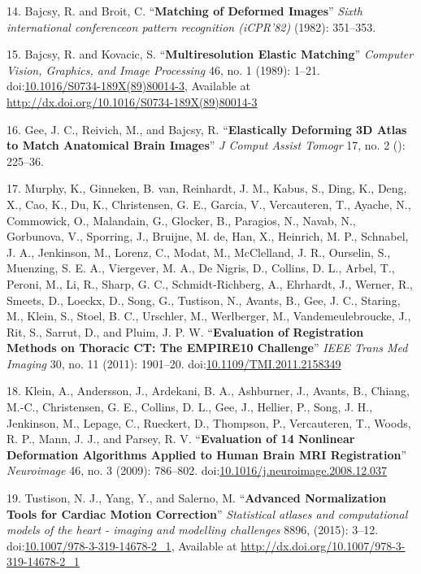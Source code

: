 \documentclass[11pt,]{article}
\begin{document}
\hypertarget{ref-Bajcsy:1982aa}{}
14. Bajcsy, R. and Broit, C. ``\textbf{Matching of Deformed Images}''
\emph{Sixth international conferenceon pattern recognition (iCPR'82)}
(1982): 351--353.

\hypertarget{ref-Bajcsy:1989aa}{}
15. Bajcsy, R. and Kovacic, S. ``\textbf{Multiresolution Elastic
Matching}'' \emph{Computer Vision, Graphics, and Image Processing} 46,
no. 1 (1989): 1--21.
doi:\href{https://doi.org/10.1016/S0734-189X(89)80014-3}{10.1016/S0734-189X(89)80014-3},
Available at \url{http://dx.doi.org/10.1016/S0734-189X(89)80014-3}

\hypertarget{ref-Gee:1993aa}{}
16. Gee, J. C., Reivich, M., and Bajcsy, R. ``\textbf{Elastically
Deforming 3D Atlas to Match Anatomical Brain Images}'' \emph{J Comput
Assist Tomogr} 17, no. 2 (): 225--36.

\hypertarget{ref-Murphy:2011aa}{}
17. Murphy, K., Ginneken, B. van, Reinhardt, J. M., Kabus, S., Ding, K.,
Deng, X., Cao, K., Du, K., Christensen, G. E., Garcia, V., Vercauteren,
T., Ayache, N., Commowick, O., Malandain, G., Glocker, B., Paragios, N.,
Navab, N., Gorbunova, V., Sporring, J., Bruijne, M. de, Han, X.,
Heinrich, M. P., Schnabel, J. A., Jenkinson, M., Lorenz, C., Modat, M.,
McClelland, J. R., Ourselin, S., Muenzing, S. E. A., Viergever, M. A.,
De Nigris, D., Collins, D. L., Arbel, T., Peroni, M., Li, R., Sharp, G.
C., Schmidt-Richberg, A., Ehrhardt, J., Werner, R., Smeets, D., Loeckx,
D., Song, G., Tustison, N., Avants, B., Gee, J. C., Staring, M., Klein,
S., Stoel, B. C., Urschler, M., Werlberger, M., Vandemeulebroucke, J.,
Rit, S., Sarrut, D., and Pluim, J. P. W. ``\textbf{Evaluation of
Registration Methods on Thoracic CT: The EMPIRE10 Challenge}''
\emph{IEEE Trans Med Imaging} 30, no. 11 (2011): 1901--20.
doi:\href{https://doi.org/10.1109/TMI.2011.2158349}{10.1109/TMI.2011.2158349}

\hypertarget{ref-Klein:2009aa}{}
18. Klein, A., Andersson, J., Ardekani, B. A., Ashburner, J., Avants,
B., Chiang, M.-C., Christensen, G. E., Collins, D. L., Gee, J., Hellier,
P., Song, J. H., Jenkinson, M., Lepage, C., Rueckert, D., Thompson, P.,
Vercauteren, T., Woods, R. P., Mann, J. J., and Parsey, R. V.
``\textbf{Evaluation of 14 Nonlinear Deformation Algorithms Applied to
Human Brain MRI Registration}'' \emph{Neuroimage} 46, no. 3 (2009):
786--802.
doi:\href{https://doi.org/10.1016/j.neuroimage.2008.12.037}{10.1016/j.neuroimage.2008.12.037}

\hypertarget{ref-Tustison:2015ab}{}
19. Tustison, N. J., Yang, Y., and Salerno, M. ``\textbf{Advanced
Normalization Tools for Cardiac Motion Correction}'' \emph{Statistical
atlases and computational models of the heart - imaging and modelling
challenges} 8896, (2015): 3--12.
doi:\href{https://doi.org/10.1007/978-3-319-14678-2_1}{10.1007/978-3-319-14678-2\_1},
Available at \url{http://dx.doi.org/10.1007/978-3-319-14678-2_1}
\end{document}
